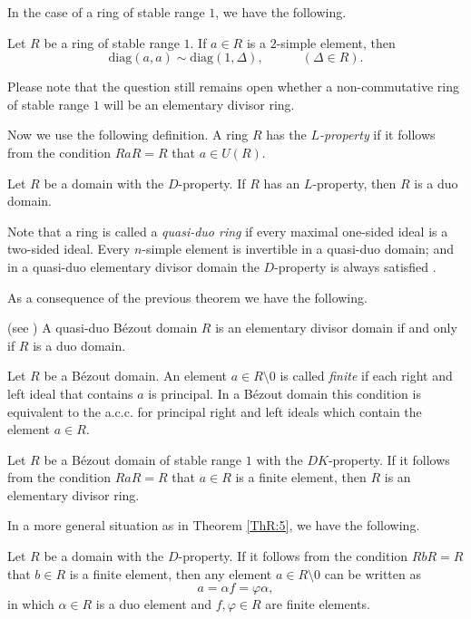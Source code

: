 \documentclass{cimart}
\begin{document}
    In the case of a ring of stable range $1$, we have the following.


\begin{theorem}\label{NewT:6} %
Let $R$ be a ring of stable range $1$. If $a\in R$ is a $2$-simple element, then
\[
\mathrm{diag}(a,a)\sim\mathrm{diag}(1,\Delta),\qquad\quad   (\Delta \in R).
\]
\end{theorem}


Please note that the question still remains open whether a non-commutative ring of stable range $1$ will be   an elementary divisor ring.

Now we use the following definition. A ring $R$ has the {\it $L$-property} if it follows  from the  condition $RaR=R$  that  $a\in U(R)$.

\begin{theorem}\label{ThR:6}
Let $R$ be a domain with the $D$-property. If  $R$ has an   $L$-property, then $R$ is a duo domain.
\end{theorem}

Note  that  a ring is called a {\it quasi-duo ring} if   every maximal one-sided ideal is a two-sided ideal. Every  $n$-simple element is invertible in a quasi-duo domain; and in a quasi-duo elementary divisor domain the $D$-property is always satisfied  \cite[Theorem~1]{2-zabkom}.


As a consequence of the previous theorem we have the following.

\begin{corollary}\label{theor-15} (see \cite[Theorems 1 and 2]{2-zabkom})
A quasi-duo B\'ezout domain $R$ is an elementary divisor domain if and only if $R$ is a duo domain.
\end{corollary}



Let $R$ be a B\'ezout domain. An element $a\in R\setminus {0}$ is called {\it finite} if each right and left ideal that contains $a$ is principal. In a B\'ezout domain this condition is equivalent to the a.c.c. for principal right and left ideals which contain the element $a\in R$.

\begin{corollary}\label{theor-17}
Let $R$ be a B\'ezout domain of stable range $1$ with the $DK$-property. If it follows  from the  condition $RaR=R$  that   $a\in R$ is a finite element, then  $R$ is an elementary divisor ring.
\end{corollary}

In a more general situation as in Theorem \ref{ThR:5}, we have the following.
\begin{theorem}\label{ThR:7}
Let $R$ be a  domain with the  $D$-property.  If it follows  from the  condition $RbR=R$  that   $b\in R$ is a finite element, then any element   $a\in R\setminus {0}$ can be written as
\[
a=\alpha f=\varphi \alpha,
\]
in which  $\alpha\in R$ is a duo element and $f, \varphi\in R$ are  finite elements.
\end{theorem}
\end{document}
